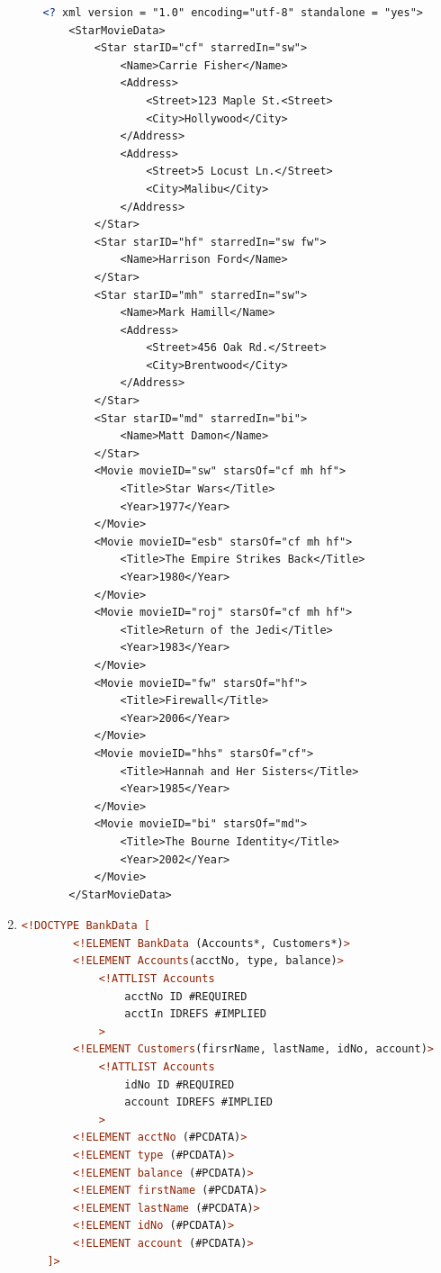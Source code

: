 \documentclass[12pt]{article}
\begin{document}
\begin{enumerate}[1.]
\begin{enumerate}[a)]
    \begin{lstlisting}[language=XML]
    <? xml version = "1.0" encoding="utf-8" standalone = "yes">
    <StarMovieData>
        <Star starID="cf" starredIn="sw">
            <Name>Carrie Fisher</Name>
            <Address>
                <Street>123 Maple St.<Street>
                <City>Hollywood</City>
            </Address>
            <Address>
                <Street>5 Locust Ln.</Street>
                <City>Malibu</City>
            </Address>
        </Star>
        <Star starID="hf" starredIn="sw fw">
            <Name>Harrison Ford</Name>
        </Star>
        <Star starID="mh" starredIn="sw">
            <Name>Mark Hamill</Name>
            <Address>
                <Street>456 Oak Rd.</Street>
                <City>Brentwood</City>
            </Address>
        </Star>
        <Star starID="md" starredIn="bi">
            <Name>Matt Damon</Name>
        </Star>
        <Movie movieID="sw" starsOf="cf mh hf">
            <Title>Star Wars</Title>
            <Year>1977</Year>
        </Movie>
        <Movie movieID="esb" starsOf="cf mh hf">
            <Title>The Empire Strikes Back</Title>
            <Year>1980</Year>
        </Movie>
        <Movie movieID="roj" starsOf="cf mh hf">
            <Title>Return of the Jedi</Title>
            <Year>1983</Year>
        </Movie>
        <Movie movieID="fw" starsOf="hf">
            <Title>Firewall</Title>
            <Year>2006</Year>
        </Movie>
        <Movie movieID="hhs" starsOf="cf">
            <Title>Hannah and Her Sisters</Title>
            <Year>1985</Year>
        </Movie>
        <Movie movieID="bi" starsOf="md">
            <Title>The Bourne Identity</Title>
            <Year>2002</Year>
        </Movie>
    </StarMovieData>
    \end{lstlisting}

    \end{enumerate}

    \item

    \begin{lstlisting}[language=XML]
    <!DOCTYPE BankData [
        <!ELEMENT BankData (Accounts*, Customers*)>
        <!ELEMENT Accounts(acctNo, type, balance)>
            <!ATTLIST Accounts
                acctNo ID #REQUIRED
                acctIn IDREFS #IMPLIED
            >
        <!ELEMENT Customers(firsrName, lastName, idNo, account)>
            <!ATTLIST Accounts
                idNo ID #REQUIRED
                account IDREFS #IMPLIED
            >
        <!ELEMENT acctNo (#PCDATA)>
        <!ELEMENT type (#PCDATA)>
        <!ELEMENT balance (#PCDATA)>
        <!ELEMENT firstName (#PCDATA)>
        <!ELEMENT lastName (#PCDATA)>
        <!ELEMENT idNo (#PCDATA)>
        <!ELEMENT account (#PCDATA)>
    ]>
    \end{lstlisting}


\end{enumerate}
\end{document}
